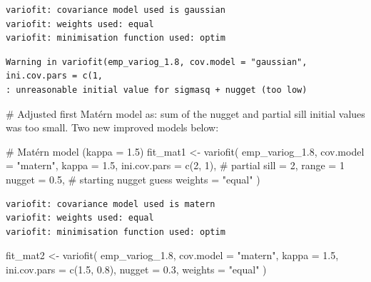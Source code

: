 \documentclass[
  11pt,
]{article}
\newenvironment{Shaded}{\begin{snugshade}}{\end{snugshade}}
\newcommand{\AttributeTok}[1]{\textcolor[rgb]{0.40,0.45,0.13}{#1}}
\newcommand{\CommentTok}[1]{\textcolor[rgb]{0.37,0.37,0.37}{#1}}
\newcommand{\DecValTok}[1]{\textcolor[rgb]{0.68,0.00,0.00}{#1}}
\newcommand{\FloatTok}[1]{\textcolor[rgb]{0.68,0.00,0.00}{#1}}
\newcommand{\FunctionTok}[1]{\textcolor[rgb]{0.28,0.35,0.67}{#1}}
\newcommand{\NormalTok}[1]{\textcolor[rgb]{0.00,0.23,0.31}{#1}}
\newcommand{\OtherTok}[1]{\textcolor[rgb]{0.00,0.23,0.31}{#1}}
\newcommand{\StringTok}[1]{\textcolor[rgb]{0.13,0.47,0.30}{#1}}
\begin{document}
\begin{verbatim}
variofit: covariance model used is gaussian 
variofit: weights used: equal 
variofit: minimisation function used: optim 
\end{verbatim}

\begin{verbatim}
Warning in variofit(emp_variog_1.8, cov.model = "gaussian", ini.cov.pars = c(1,
: unreasonable initial value for sigmasq + nugget (too low)
\end{verbatim}

\begin{Shaded}
\begin{Highlighting}[]
\CommentTok{\# Adjusted first Matérn model as: sum of the nugget and partial sill initial values was too small. Two new improved models below:}

\CommentTok{\# Matérn model (kappa = 1.5)}
\NormalTok{fit\_mat1 }\OtherTok{\textless{}{-}} \FunctionTok{variofit}\NormalTok{(}
\NormalTok{  emp\_variog\_1}\FloatTok{.8}\NormalTok{,}
  \AttributeTok{cov.model =} \StringTok{"matern"}\NormalTok{,}
  \AttributeTok{kappa =} \FloatTok{1.5}\NormalTok{,}
  \AttributeTok{ini.cov.pars =} \FunctionTok{c}\NormalTok{(}\DecValTok{2}\NormalTok{, }\DecValTok{1}\NormalTok{),   }\CommentTok{\# partial sill = 2, range = 1}
  \AttributeTok{nugget =} \FloatTok{0.5}\NormalTok{,             }\CommentTok{\# starting nugget guess}
  \AttributeTok{weights =} \StringTok{"equal"}
\NormalTok{)}
\end{Highlighting}
\end{Shaded}

\begin{verbatim}
variofit: covariance model used is matern 
variofit: weights used: equal 
variofit: minimisation function used: optim 
\end{verbatim}

\begin{Shaded}
\begin{Highlighting}[]
\NormalTok{fit\_mat2 }\OtherTok{\textless{}{-}} \FunctionTok{variofit}\NormalTok{(}
\NormalTok{  emp\_variog\_1}\FloatTok{.8}\NormalTok{,}
  \AttributeTok{cov.model =} \StringTok{"matern"}\NormalTok{,}
  \AttributeTok{kappa =} \FloatTok{1.5}\NormalTok{,}
  \AttributeTok{ini.cov.pars =} \FunctionTok{c}\NormalTok{(}\FloatTok{1.5}\NormalTok{, }\FloatTok{0.8}\NormalTok{),}
  \AttributeTok{nugget =} \FloatTok{0.3}\NormalTok{,}
  \AttributeTok{weights =} \StringTok{"equal"}
\NormalTok{)}
\end{Highlighting}
\end{Shaded}
\end{document}
